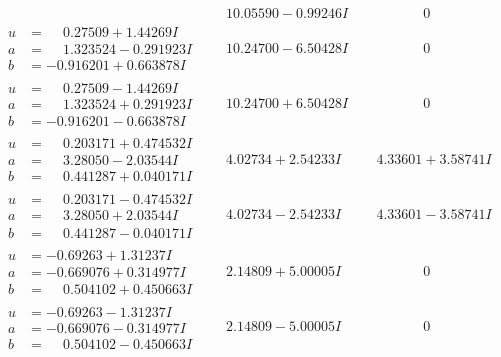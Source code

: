 \documentclass[1p]{elsarticle_modified}
\theoremstyle{definition}
\begin{document}
$$\begin{array}{c|c|c}
 & \phantom{-}10.05590 - 0.99246 I & \phantom{-0.000000 } 0 \\ \hline\begin{aligned}
u &= \phantom{-}0.27509 + 1.44269 I \\
a &= \phantom{-}1.323524 - 0.291923 I \\
b &= -0.916201 + 0.663878 I\end{aligned}
 & \phantom{-}10.24700 - 6.50428 I & \phantom{-0.000000 } 0 \\ \hline\begin{aligned}
u &= \phantom{-}0.27509 - 1.44269 I \\
a &= \phantom{-}1.323524 + 0.291923 I \\
b &= -0.916201 - 0.663878 I\end{aligned}
 & \phantom{-}10.24700 + 6.50428 I & \phantom{-0.000000 } 0 \\ \hline\begin{aligned}
u &= \phantom{-}0.203171 + 0.474532 I \\
a &= \phantom{-}3.28050 - 2.03544 I \\
b &= \phantom{-}0.441287 + 0.040171 I\end{aligned}
 & \phantom{-}4.02734 + 2.54233 I & \phantom{-}4.33601 + 3.58741 I \\ \hline\begin{aligned}
u &= \phantom{-}0.203171 - 0.474532 I \\
a &= \phantom{-}3.28050 + 2.03544 I \\
b &= \phantom{-}0.441287 - 0.040171 I\end{aligned}
 & \phantom{-}4.02734 - 2.54233 I & \phantom{-}4.33601 - 3.58741 I \\ \hline\begin{aligned}
u &= -0.69263 + 1.31237 I \\
a &= -0.669076 + 0.314977 I \\
b &= \phantom{-}0.504102 + 0.450663 I\end{aligned}
 & \phantom{-}2.14809 + 5.00005 I & \phantom{-0.000000 } 0 \\ \hline\begin{aligned}
u &= -0.69263 - 1.31237 I \\
a &= -0.669076 - 0.314977 I \\
b &= \phantom{-}0.504102 - 0.450663 I\end{aligned}
 & \phantom{-}2.14809 - 5.00005 I & \phantom{-0.000000 } 0 \\ \hline\begin{aligned}

\end{aligned}
\end{array}$$
\end{document}
